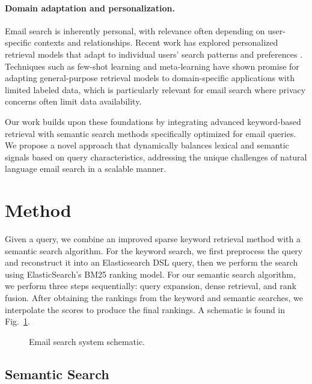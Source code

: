 \documentclass{article}
\begin{document}
\paragraph{Domain adaptation and personalization.} 
Email search is inherently personal, with relevance often depending on user-specific contexts and relationships. Recent work has explored personalized retrieval models that adapt to individual users' search patterns and preferences \citep{zamani2017situational, ai2018learning}. Techniques such as few-shot learning \citep{snell2017prototypical} and meta-learning \citep{finn2017model} have shown promise for adapting general-purpose retrieval models to domain-specific applications with limited labeled data, which is particularly relevant for email search where privacy concerns often limit data availability.

Our work builds upon these foundations by integrating advanced keyword-based retrieval with semantic search methods specifically optimized for email queries. We propose a novel approach that dynamically balances lexical and semantic signals based on query characteristics, addressing the unique challenges of natural language email search in a scalable manner.

\section{Method}

Given a query, we combine an improved sparse keyword retrieval method with a semantic search algorithm. For the keyword search, we first preprocess the query and reconstruct it into an Elasticsearch DSL query, then we perform the search using ElasticSearch's BM25 ranking model. For our semantic search algorithm, we perform three steps sequentially: query expansion, dense retrieval, and rank fusion. After obtaining the rankings from the keyword and semantic searches, we interpolate the scores to produce the final rankings. A schematic is found in Fig.~\ref{fig:schematic}.

\begin{figure}[ht]
  \centering
  \caption{Email search system schematic.}
  \label{fig:schematic}
\end{figure}

\subsection{Semantic Search}
\end{document}
